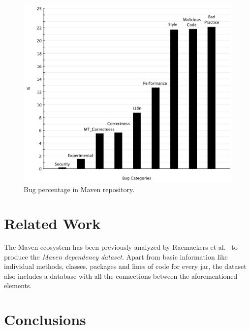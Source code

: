 \documentclass{sig-alternate}
\begin{document}
\begin{figure}[t]
	\centering
	\includegraphics[scale=0.38]{figures/bug_percent}
	\caption{Bug percentage in Maven repository.}
	\label{fig:bug-per} 
\end{figure}

\section{Related Work}
\label{sec:rel}

The Maven ecosystem has been previously analyzed by
Raemaekers et al.~\cite{RDV13}
to produce the {\it Maven dependency dataset}.
Apart from basic information like individual methods, classes,
packages and lines of code for every {\sc jar}, the dataset
also includes a database with all the
connections between the aforementioned elements.

\section{Conclusions}
\label{sec:conc}


  
\end{document}
